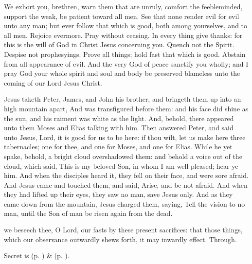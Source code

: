  We exhort you, brethren, warn them that are unruly, comfort the feebleminded, support the weak, be patient toward all men. See that none render evil for evil unto any man; but ever follow that which is good, both among yourselves, and to all men. Rejoice evermore. Pray without ceasing. In every thing give thanks: for this is the will of God in Christ Jesus concerning you. Quench not the Spirit. Despise not prophesyings. Prove all things; hold fast that which is good. Abstain from all appearance of evil. And the very God of peace sanctify you wholly; and I pray God your whole spirit and soul and body be preserved blameless unto the coming of our Lord Jesus Christ.


 Jesus taketh Peter, James, and John his brother, and bringeth them up into an high mountain apart, And was transfigured before them: and his face did shine as the sun, and his raiment was white as the light. And, behold, there appeared unto them Moses and Elias talking with him. Then answered Peter, and said unto Jesus, Lord, it is good for us to be here: if thou wilt, let us make here three tabernacles; one for thee, and one for Moses, and one for Elias. While he yet spake, behold, a bright cloud overshadowed them: and behold a voice out of the cloud, which said, This is my beloved Son, in whom I am well pleased; hear ye him. And when the disciples heard it, they fell on their face, and were sore afraid. And Jesus came and touched them, and said, Arise, and be not afraid. And when they had lifted up their eyes, they saw no man, save Jesus only. And as they came down from the mountain, Jesus charged them, saying, Tell the vision to no man, until the Son of man be risen again from the dead.


\secret
{} we beseech thee, O Lord, our fasts by these present sacrifices: that those things, which our observance outwardly shews forth, it may inwardly effect. Through.
\begin{rubric}
     Secret is  (p. \pageref{SPSaints}) \&   (p. \pageref{SPLivingDeparted}).
\end{rubric}


